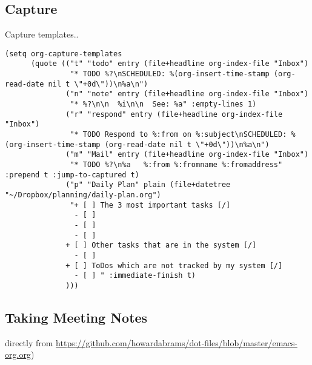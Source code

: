 \documentclass[12pt]{article}
\begin{document}
\subsection{Capture}
\label{sec:org1b45775}
Capture templates..
\lstset{language=Lisp,label= ,caption= ,captionpos=b,numbers=none}
\begin{lstlisting}
(setq org-capture-templates
      (quote (("t" "todo" entry (file+headline org-index-file "Inbox")
               "* TODO %?\nSCHEDULED: %(org-insert-time-stamp (org-read-date nil t \"+0d\"))\n%a\n")
              ("n" "note" entry (file+headline org-index-file "Inbox")
               "* %?\n\n  %i\n\n  See: %a" :empty-lines 1)
              ("r" "respond" entry (file+headline org-index-file "Inbox")
               "* TODO Respond to %:from on %:subject\nSCHEDULED: %(org-insert-time-stamp (org-read-date nil t \"+0d\"))\n%a\n")
              ("m" "Mail" entry (file+headline org-index-file "Inbox")
               "* TODO %?\n%a   %:from %:fromname %:fromaddress" :prepend t :jump-to-captured t)
              ("p" "Daily Plan" plain (file+datetree "~/Dropbox/planning/daily-plan.org")
               "+ [ ] The 3 most important tasks [/]
                - [ ] 
                - [ ] 
                - [ ] 
              + [ ] Other tasks that are in the system [/]
                - [ ] 
              + [ ] ToDos which are not tracked by my system [/]
                - [ ] " :immediate-finish t)
              )))
\end{lstlisting}

\subsection{Taking Meeting Notes}
\label{sec:org0855ce2}

directly from \url{https://github.com/howardabrams/dot-files/blob/master/emacs-org.org})
\end{document}
